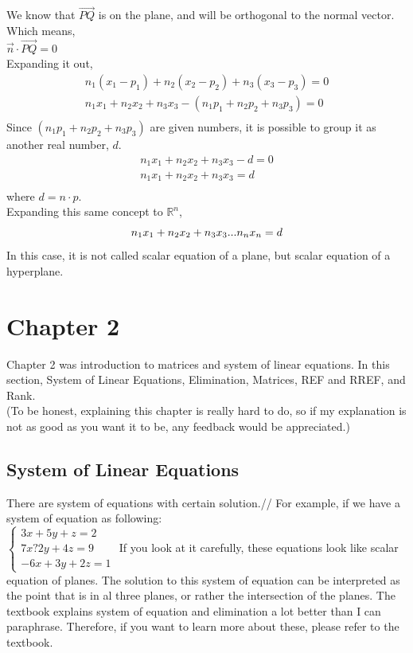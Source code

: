 \documentclass[12pt]{article}
\newcommand{\R}{\mathbb{R}}
\begin{document}
We know that $\vec{PQ}$ is on the plane, and will be orthogonal to the normal vector. Which means,\\
$\vec{n} \cdot \vec{PQ} = 0$\\
Expanding it out, 
\begin{equation}
\begin{split}
n_1(x_1-p_1)+n_2(x_2-p_2)+n_3(x_3-p_3)=0\\
n_1x_1 + n_2x_2 +n_3x_3 - (n_1p_1+n_2p_2+n_3p_3)= 0\\
\end{split}
\end{equation} 
Since $(n_1p_1+n_2p_2+n_3p_3)$ are given numbers, it is possible to group it as another real number, $d$.\\
\begin{equation}
\begin{split}
n_1x_1 + n_2x_2 +n_3x_3 - d = 0\\
n_1x_1 + n_2x_2 +n_3x_3 = d\\
\end{split}
\end{equation}
where $d = n\cdot p$.\\
Expanding this same concept to $\R^n$,
\begin{equation}
n_1x_1 + n_2x_2 +n_3x_3...n_nx_n = d\\
\end{equation}
In this case, it is not called scalar equation of a plane, but scalar equation of a hyperplane.

\section{Chapter 2}
Chapter 2 was introduction to matrices and system of linear equations. In this section, System of Linear Equations, Elimination, Matrices, REF and RREF, and Rank.\\
(To be honest, explaining this chapter is really hard to do, so if my explanation is not as good as you want it to be, any feedback would be appreciated.)

\subsection{System of Linear Equations}
There are system of equations with certain solution.//
For example, if we have a system of equation as following:\\
$\begin{cases} 3x + 5y + z = 2\\ 7x ? 2y + 4z = 9 \\ -6x + 3y + 2z = 1\end{cases}$
If you look at it carefully, these equations look like scalar equation of planes. The solution to this system of equation can be interpreted as the point that is in al three planes, or rather the intersection of the planes. 
The textbook explains system of equation and elimination a lot better than I can paraphrase. Therefore, if you want to learn more about these, please refer to the textbook.
\end{document}
